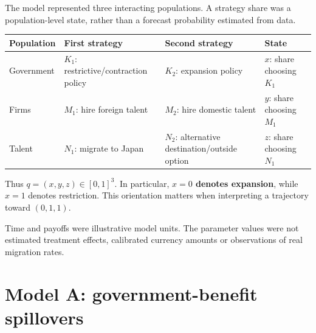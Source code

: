 \documentclass[
  11pt,
  letterpaper,
]{article}
\begin{document}
The model represented three interacting populations. A strategy share
was a population-level state, rather than a forecast probability
estimated from data.

\begin{longtable}[]{@{}
  >{\raggedright\arraybackslash}p{}
  >{\raggedright\arraybackslash}p{}
  >{\raggedright\arraybackslash}p{}
  >{\raggedright\arraybackslash}p{}@{}}
\toprule\noalign{}
\begin{minipage}[b]{\linewidth}\raggedright
Population
\end{minipage} & \begin{minipage}[b]{\linewidth}\raggedright
First strategy
\end{minipage} & \begin{minipage}[b]{\linewidth}\raggedright
Second strategy
\end{minipage} & \begin{minipage}[b]{\linewidth}\raggedright
State
\end{minipage} \\
\midrule\noalign{}
\endhead
\bottomrule\noalign{}
\endlastfoot
Government & \(K_1\): restrictive/contraction policy & \(K_2\):
expansion policy & \(x\): share choosing \(K_1\) \\
Firms & \(M_1\): hire foreign talent & \(M_2\): hire domestic talent &
\(y\): share choosing \(M_1\) \\
Talent & \(N_1\): migrate to Japan & \(N_2\): alternative
destination/outside option & \(z\): share choosing \(N_1\) \\
\end{longtable}

Thus \(q=(x,y,z)\in[0,1]^3\). In particular, \textbf{\(x=0\) denotes
expansion}, while \(x=1\) denotes restriction. This orientation matters
when interpreting a trajectory toward \((0,1,1)\).

Time and payoffs were illustrative model units. The parameter values
were not estimated treatment effects, calibrated currency amounts or
observations of real migration rates.

\section{Model A: government-benefit
spillovers}\label{model-a-government-benefit-spillovers}
\end{document}
